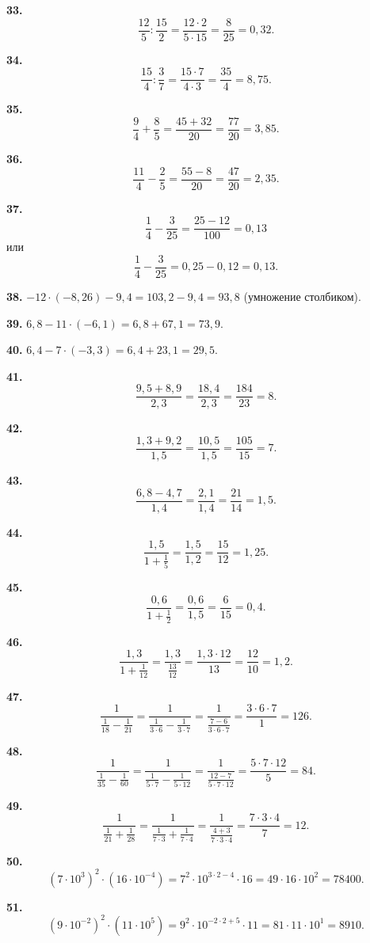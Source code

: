 \textbf{33.} $$\frac{12}{5}:\frac{15}{2}=\frac{12\cdot2}{5\cdot15}=\frac{8}{25}=0,32.$$

\textbf{34.} $$\frac{15}{4}:\frac{3}{7}=\frac{15\cdot7}{4\cdot3}=\frac{35}{4}=8,75.$$

\textbf{35.} $$\frac{9}{4}+\frac{8}{5}=\frac{45+32}{20}=\frac{77}{20}=3,85.$$

\textbf{36.} $$\frac{11}{4}-\frac{2}{5}=\frac{55-8}{20}=\frac{47}{20}=2,35.$$

\newpage \textbf{37.} $$\frac{1}{4}-\frac{3}{25}=\frac{25-12}{100}=0,13$$ или $$\frac{1}{4}-\frac{3}{25}=0,25-0,12=0,13.$$

\textbf{38.} $-12\cdot\left(-8,26\right)-9,4=103,2-9,4=93,8$ (умножение столбиком).

\textbf{39.} $6,8-11\cdot\left(-6,1\right)=6,8+67,1=73,9.$

\textbf{40.} $6,4-7\cdot\left(-3,3\right)=6,4+23,1=29,5.$

\textbf{41.} $$\frac{9,5+8,9}{2,3}=\frac{18,4}{2,3}=\frac{184}{23}=8.$$

\textbf{42.} $$\frac{1,3+9,2}{1,5}=\frac{10,5}{1,5}=\frac{105}{15}=7.$$

\textbf{43.} $$\frac{6,8-4,7}{1,4}=\frac{2,1}{1,4}=\frac{21}{14}=1,5.$$

\textbf{44.} $$\frac{1,5}{1+\frac{1}{5}}=\frac{1,5}{1,2}=\frac{15}{12}=1,25.$$

\textbf{45.} $$\frac{0,6}{1+\frac{1}{2}}=\frac{0,6}{1,5}=\frac{6}{15}=0,4.$$

\textbf{46.} $$\frac{1,3}{1+\frac{1}{12}}=\frac{1,3}{\frac{13}{12}}=\frac{1,3\cdot12}{13}=\frac{12}{10}=1,2.$$

\textbf{47.}  $$\frac{1}{\frac{1}{18}-\frac{1}{21}}=\frac{1}{\frac{1}{3\cdot6}-\frac{1}{3\cdot7}}=\frac{1}{\frac{7-6}{3\cdot6\cdot7}}=\frac{3\cdot6\cdot7}{1}=126.$$

\newpage \textbf{48.} $$\frac{1}{\frac{1}{35}-\frac{1}{60}}=\frac{1}{\frac{1}{5\cdot7}-\frac{1}{5\cdot12}}=\frac{1}{\frac{12-7}{5\cdot7\cdot12}}=\frac{5\cdot7\cdot12}{5}=84.$$

\textbf{49.} $$\frac{1}{\frac{1}{21}+\frac{1}{28}}=\frac{1}{\frac{1}{7\cdot3}+\frac{1}{7\cdot4}}=\frac{1}{\frac{4+3}{7\cdot3\cdot4}}=\frac{7\cdot3\cdot4}{7}=12.$$

\textbf{50.} $$\left(7\cdot10^3\right)^2\cdot\left(16\cdot10^{-4}\right)=7^2\cdot10^{3\cdot2-4}\cdot16=49\cdot16\cdot10^2=78400.$$

\textbf{51.} $$\left(9\cdot10^{-2}\right)^2\cdot\left(11\cdot10^5\right)=9^2\cdot10^{-2\cdot2+5}\cdot11=81\cdot11\cdot10^1=8910.$$

